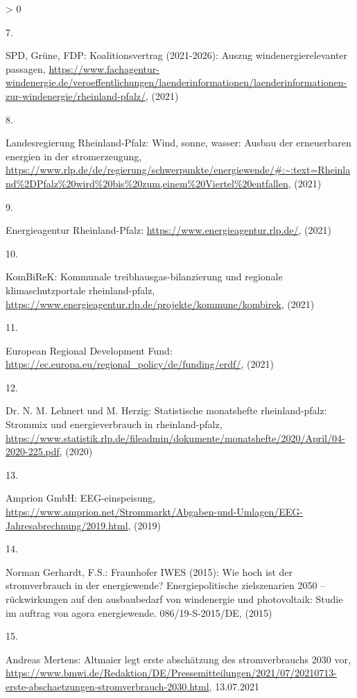 \documentclass[a4paper,11pt]{article}
\newlength{\cslhangindent}
\newlength{\csllabelwidth}
\newenvironment{CSLReferences}[3] %
 {%
  \setlength{\parindent}{0pt}
  \ifodd #1 \everypar{\setlength{\hangindent}{\cslhangindent}}\ignorespaces\fi
  \ifnum #2 > 0
  \setlength{\parskip}{#2\baselineskip}
  \fi
 }%
 {}
\newcommand{\CSLLeftMargin}[1]{\parbox[t]{\maxof{\widthof{#1}}{\csllabelwidth}}{#1}}
\newcommand{\CSLRightInline}[1]{\parbox[t]{\linewidth}{#1}}
\begin{document}
\begin{CSLReferences}{0}{0}
\leavevmode\hypertarget{ref-SPDGruneFDP.2021}{}%
\CSLLeftMargin{7. }
\CSLRightInline{SPD, Grüne, FDP: Koalitionsvertrag (2021-2026): Auszug windenergierelevanter passagen, \url{https://www.fachagentur-windenergie.de/veroeffentlichungen/laenderinformationen/laenderinformationen-zur-windenergie/rheinland-pfalz/}, (2021)}

\leavevmode\hypertarget{ref-LandesregierungRheinlandPfalz.2021}{}%
\CSLLeftMargin{8. }
\CSLRightInline{Landesregierung Rheinland-Pfalz: Wind, sonne, wasser: Ausbau der erneuerbaren energien in der stromerzeugung, \url{https://www.rlp.de/de/regierung/schwerpunkte/energiewende/\#:~:text=Rheinland\%2DPfalz\%20wird\%20bis\%20zum,einem\%20Viertel\%20entfallen}, (2021)}

\leavevmode\hypertarget{ref-EnergieagenturRheinlandPfalz.2021}{}%
\CSLLeftMargin{9. }
\CSLRightInline{Energieagentur Rheinland-Pfalz: \url{https://www.energieagentur.rlp.de/}, (2021)}

\leavevmode\hypertarget{ref-KomBiReK.2021}{}%
\CSLLeftMargin{10. }
\CSLRightInline{KomBiReK: Kommunale treibhausgas-bilanzierung und regionale klimaschutzportale rheinland-pfalz, \url{https://www.energieagentur.rlp.de/projekte/kommune/kombirek}, (2021)}

\leavevmode\hypertarget{ref-EuropeanRegionalDevelopmentFund.2021}{}%
\CSLLeftMargin{11. }
\CSLRightInline{European Regional Development Fund: \url{https://ec.europa.eu/regional_policy/de/funding/erdf/}, (2021)}

\leavevmode\hypertarget{ref-Lehnert.2020}{}%
\CSLLeftMargin{12. }
\CSLRightInline{Dr. N. M. Lehnert und M. Herzig: Statistische monatshefte rheinland-pfalz: Strommix und energieverbrauch in rheinland-pfalz, \url{https://www.statistik.rlp.de/fileadmin/dokumente/monatshefte/2020/April/04-2020-225.pdf}, (2020)}

\leavevmode\hypertarget{ref-AmprionGmbH.2019}{}%
\CSLLeftMargin{13. }
\CSLRightInline{Amprion GmbH: EEG-einspeisung, \url{https://www.amprion.net/Strommarkt/Abgaben-und-Umlagen/EEG-Jahresabrechnung/2019.html}, (2019)}

\leavevmode\hypertarget{ref-NormanGerhardt.2015}{}%
\CSLLeftMargin{14. }
\CSLRightInline{Norman Gerhardt, F.S.: Fraunhofer IWES (2015): Wie hoch ist der stromverbrauch in der energiewende? Energiepolitische zielszenarien 2050 -- r{ü}ckwirkungen auf den ausbaubedarf von windenergie und photovoltaik: Studie im auftrag von agora energiewende. 086/19-S-2015/DE, (2015)}

\leavevmode\hypertarget{ref-AndreasMertens.13.07.2021}{}%
\CSLLeftMargin{15. }
\CSLRightInline{Andreas Mertens: Altmaier legt erste absch{ä}tzung des stromverbrauchs 2030 vor, \url{https://www.bmwi.de/Redaktion/DE/Pressemitteilungen/2021/07/20210713-erste-abschaetzungen-stromverbrauch-2030.html}, 13.07.2021}


\end{CSLReferences}
\end{document}

